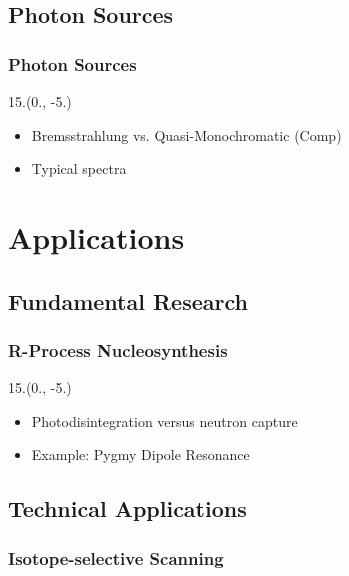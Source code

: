 \documentclass{beamer}
\begin{document}
\subsection{Photon Sources}

\begin{frame}
    \frametitle{Photon Sources}
    \begin{textblock}{15.}(0., -5.)
        \begin{itemize}
            \item Bremsstrahlung vs. Quasi-Monochromatic (Comp)
            \item Typical spectra
        \end{itemize}
    \end{textblock}
\end{frame}

\section{Applications}

\subsection{Fundamental Research}

\begin{frame}
    \frametitle{R-Process Nucleosynthesis}
    \begin{textblock}{15.}(0., -5.)
        \begin{itemize}
            \item Photodisintegration versus neutron capture
            \item Example: Pygmy Dipole Resonance
        \end{itemize}
    \end{textblock}    
\end{frame}

\subsection{Technical Applications}

\begin{frame}
    \frametitle{Isotope-selective Scanning}
\end{frame}
\end{document}
